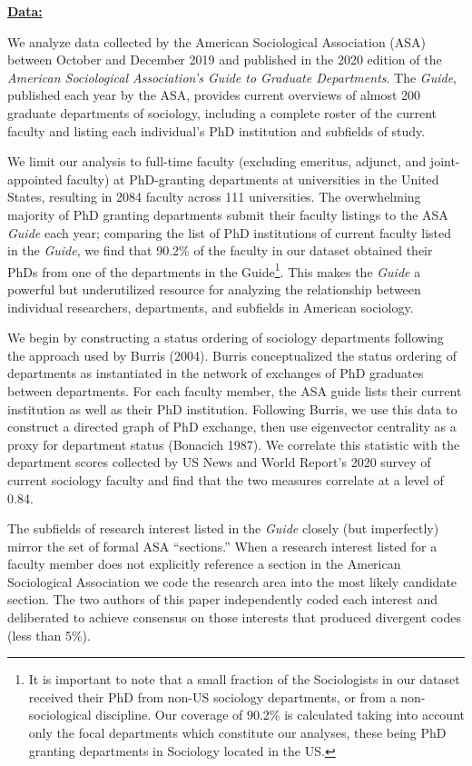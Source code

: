 \documentclass{article}
\begin{document}
\textbf{\uline{Data:}}

We analyze data collected by the American Sociological Association (ASA)
between October and December 2019 and published in the 2020 edition of
the \emph{American Sociological Association's Guide to Graduate
Departments}. The \emph{Guide}, published each year by the ASA, provides
current overviews of almost 200 graduate departments of sociology,
including a complete roster of the current faculty and listing each
individual's PhD institution and subfields of study.

We limit our analysis to full-time faculty (excluding emeritus, adjunct,
and joint-appointed faculty) at PhD-granting departments at universities
in the United States, resulting in 2084 faculty across 111 universities.
The overwhelming majority of PhD granting departments submit their
faculty listings to the ASA \emph{Guide} each year; comparing the list
of PhD institutions of current faculty listed in the \emph{Guide}, we
find that 90.2\% of the faculty in our dataset obtained their PhDs from
one of the departments in the Guide\footnote{It is important to note
  that a small fraction of the Sociologists in our dataset received
  their PhD from non-US sociology departments, or from a
  non-sociological discipline. Our coverage of 90.2\% is calculated
  taking into account only the focal departments which constitute our
  analyses, these being PhD granting departments in Sociology located in
  the US.}. This makes the \emph{Guide} a powerful but underutilized
resource for analyzing the relationship between individual researchers,
departments, and subfields in American sociology.

We begin by constructing a status ordering of sociology departments
following the approach used by Burris (2004). Burris conceptualized the
status ordering of departments as instantiated in the network of
exchanges of PhD graduates between departments. For each faculty member,
the ASA guide lists their current institution as well as their PhD
institution. Following Burris, we use this data to construct a directed
graph of PhD exchange, then use eigenvector centrality as a proxy for
department status (Bonacich 1987). We correlate this statistic with the
department scores collected by US News and World Report's 2020 survey of
current sociology faculty and find that the two measures correlate at a
level of 0.84.

The subfields of research interest listed in the \emph{Guide} closely
(but imperfectly) mirror the set of formal ASA ``sections.'' When a
research interest listed for a faculty member does not explicitly
reference a section in the American Sociological Association we code the
research area into the most likely candidate section. The two authors of
this paper independently coded each interest and deliberated to achieve
consensus on those interests that produced divergent codes (less than
5\%).
\end{document}
